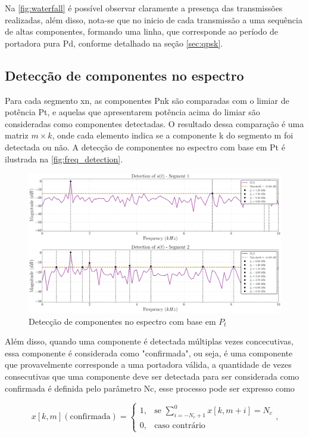 Na \ref{fig:waterfall} é possível observar claramente a presença das transmissões realizadas, além disso, nota-se que no inicio de cada transmissão a uma sequência de altas componentes, formando uma linha, que corresponde ao período de portadora pura \gls{Pd}, conforme detalhado na seção \ref{sec:qpsk}.

\subsection{Detecção de componentes no espectro}\label{sec:comparacao_potencia}

Para cada segmento \gls{xn}, as componentes \gls{Pnk} são comparadas com o limiar de potência \gls{Pt}, e aquelas que apresentarem potência acima do limiar são consideradas como componentes detectadas. O resultado dessa comparação é uma matriz $m \times k$, onde cada elemento indica se a componente \gls{k} do segmento \gls{m} foi detectada ou não. A detecção de componentes no espectro com base em \gls{Pt} é ilustrada na \autoref{fig:freq_detection}.

\begin{figure}[H]
	\centering
	\caption{Detecção de componentes no espectro com base em $P_t$}\label{fig:freq_detection}
	\includegraphics[width=\linewidth]{assets/cap3/example_detector_freq.pdf}
\end{figure}

Além disso, quando uma componente é detectada múltiplas vezes concecutivas, essa componente é considerada como "confirmada", ou seja, é uma componente que provavelmente corresponde a uma portadora válida, a quantidade de vezes consecutivas que uma componente deve ser detectada para ser considerada como confirmada é definida pelo parâmetro \gls{Nc}, esse processo pode ser expresso como

\begin{equation}
	x[k,m](\text{confirmada}) =
	\begin{cases} 
		1, & \text{se } \displaystyle\sum_{i=-N_c + 1}^{0} {x}[k,m+i] = N_c \\[8pt]
		0, & \text{caso contrário}
	\end{cases} \text{,}
\end{equation}

